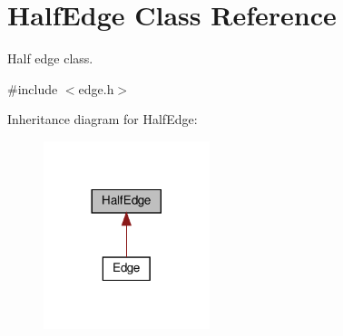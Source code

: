 \hypertarget{classHalfEdge}{}\section{Half\+Edge Class Reference}
\label{classHalfEdge}


Half edge class.  




{\ttfamily \#include $<$edge.\+h$>$}



Inheritance diagram for Half\+Edge\+:
\nopagebreak
\begin{figure}[H]
\begin{center}
\leavevmode
\includegraphics[width=137pt]{classHalfEdge__inherit__graph}
\end{center}
\end{figure}
